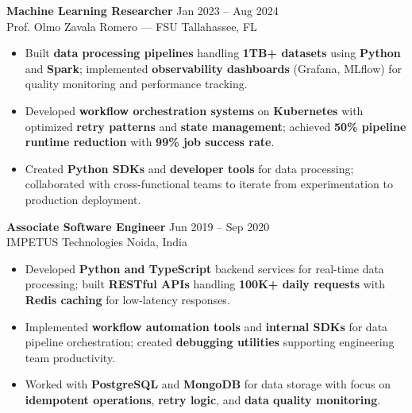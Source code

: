 \documentclass[letterpaper,10pt]{article}
\newcommand{\resumeItem}[1]{\item\small #1}
\newcommand{\resumeSubheading}[4]{
  \vspace{6pt}
  \noindent
  \textbf{#1} \hfill {\footnotesize #2} \\
  [-1pt]
  \noindent
  \small #3 \hfill {\small #4}
  \vspace{3pt}
}
\newcommand{\resumeItemsStart}{\vspace{-2pt}\begin{itemize}}
\newcommand{\resumeItemsEnd}{\end{itemize}\vspace{6pt}}
\begin{document}
\resumeSubheading
{Machine Learning Researcher}{Jan 2023 -- Aug 2024}
{Prof. Olmo Zavala Romero — FSU}{Tallahassee, FL}
\resumeItemsStart
\resumeItem{Built \textbf{data processing pipelines} handling \textbf{1TB+ datasets} using \textbf{Python} and \textbf{Spark}; implemented \textbf{observability dashboards} (Grafana, MLflow) for quality monitoring and performance tracking.}
\resumeItem{Developed \textbf{workflow orchestration systems} on \textbf{Kubernetes} with optimized \textbf{retry patterns} and \textbf{state management}; achieved \textbf{50\% pipeline runtime reduction} with \textbf{99\% job success rate}.}
\resumeItem{Created \textbf{Python SDKs} and \textbf{developer tools} for data processing; collaborated with cross-functional teams to iterate from experimentation to production deployment.}
\resumeItemsEnd
\vspace{-12pt}

\resumeSubheading
{Associate Software Engineer}{Jun 2019 -- Sep 2020}
{IMPETUS Technologies}{Noida, India}
\resumeItemsStart
\resumeItem{Developed \textbf{Python and TypeScript} backend services for real-time data processing; built \textbf{RESTful APIs} handling \textbf{100K+ daily requests} with \textbf{Redis caching} for low-latency responses.}
\resumeItem{Implemented \textbf{workflow automation tools} and \textbf{internal SDKs} for data pipeline orchestration; created \textbf{debugging utilities} supporting engineering team productivity.}
\resumeItem{Worked with \textbf{PostgreSQL} and \textbf{MongoDB} for data storage with focus on \textbf{idempotent operations}, \textbf{retry logic}, and \textbf{data quality monitoring}.}
\resumeItemsEnd
\vspace{-8pt}


\end{document}

